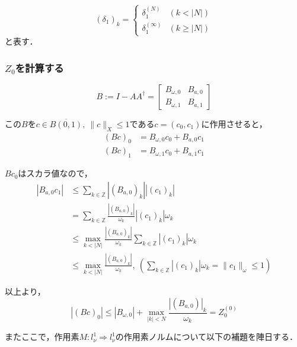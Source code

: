 \documentclass[11pt,a4paper]{jsarticle}
\theoremstyle{definition}
\begin{document}
\begin{equation*}
  \left( \delta_1 \right)_k = \begin{cases}
    \delta_1^{(N)}      & (k<|N|)      \\
    \delta_1^{(\infty)} & (k \geq |N|)
  \end{cases}
\end{equation*}
と表す．

\subsubsection{$Z_0$を計算する}
\begin{equation*}
  B := I - AA^\dagger = \begin{bmatrix}
    B_{\omega,0} & B_{a,0} \\
    B_{\omega,1} & B_{a,1}
  \end{bmatrix}
\end{equation*}

この$Bをc\in \overline{B(0,1)},\ \|c\|_X \leq 1$である$c=(c_0,c_1)$に作用させると，
\begin{align*}
  (Bc)_0 & = B_{\omega,0} c_0 + B_{a,0} c_1 \\
  (Bc)_1 & = B_{\omega,1} c_0 + B_{a,1} c_1
\end{align*}

$Bc_0$はスカラ値なので，
\begin{align*}
  \left| B_{a,0}c_1 \right| & \leq \sum_{k \in \mathbb{Z}} \left|(B_{a,0})_k\right| \left|(c_1)_k \right|                                                            \\
                            & = \sum_{k \in \mathbb{Z}} \frac{|(B_{a,0})_k|}{\omega_k} |(c_1)_k| \omega_k                                                            \\
                            & \leq \max_{k < |N|} \frac{|(B_{a,0})_k|}{\omega_k} \sum_{k \in \mathbb{Z}} |(c_1)_k| \omega_k                                          \\
                            & \leq \max_{k < |N|} \frac{|(B_{a,0})_k|}{\omega_k},\ \left( \sum_{k \in \mathbb{Z}} |(c_1)_k| \omega_k = \|c_1\|_\omega \leq 1 \right)
\end{align*}

以上より，
\begin{equation*}
  |(Bc)_0| \leq |B_{\omega,0}| + \max_{|k| < N} \frac{|(B_{a,0})|_k}{\omega_k} = Z_0^{(0)}
\end{equation*}

またここで，作用素$M:l_\nu^1 \Rightarrow l_\nu^1 $の作用素ノルムについて以下の補題を陣日する．
\end{document}
